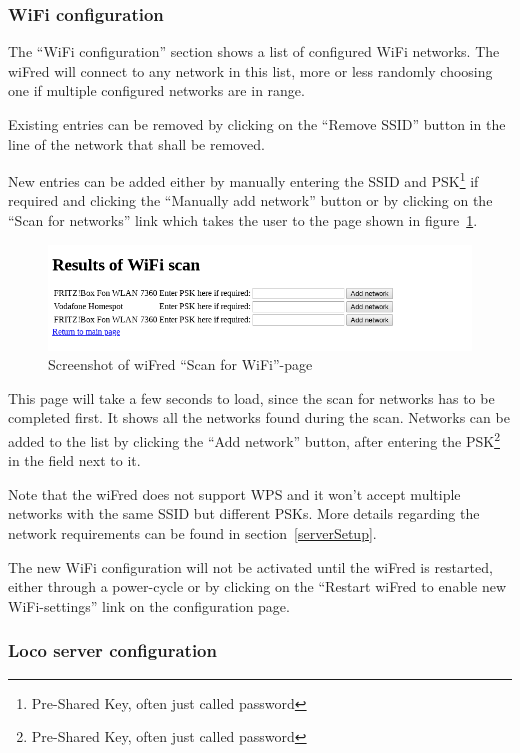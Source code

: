 \documentclass[11pt,a4paper]{scrartcl}
\begin{document}
\subsubsection{WiFi configuration}

The ``WiFi configuration'' section shows a list of configured WiFi networks. The wiFred will connect to any network in this list, more or less randomly choosing one if multiple configured networks are in range.

Existing entries can be removed by clicking on the ``Remove SSID'' button in the line of the network that shall be removed.

New entries can be added either by manually entering the SSID and PSK\footnote{Pre-Shared Key, often just called password} if required and clicking the ``Manually add network'' button or by clicking on the ``Scan for networks'' link which takes the user to the page shown in figure~\ref{throttleConfWiFiPage}.

\begin{figure}[tbh]
  \centering
  \includegraphics[width=0.8 \textwidth]{images/wiFred_wifi-scan_page}
  \caption{Screenshot of wiFred ``Scan for WiFi''-page}
  \label{throttleConfWiFiPage}
\end{figure}

This page will take a few seconds to load, since the scan for networks has to be completed first. It shows all the networks found during the scan. Networks can be added to the list by clicking the ``Add network'' button, after entering the PSK\footnote{Pre-Shared Key, often just called password} in the field next to it.

Note that the wiFred does not support WPS and it won't accept multiple networks with the same SSID but different PSKs. More details regarding the network requirements can be found in section~\ref{serverSetup}.

The new WiFi configuration will not be activated until the wiFred is restarted, either through a power-cycle or by clicking on the ``Restart wiFred to enable new WiFi-settings'' link on the configuration page.

\subsubsection{Loco server configuration}
\end{document}
